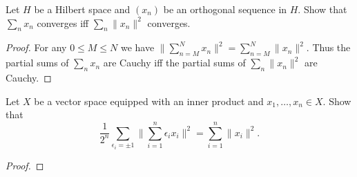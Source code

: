 \documentclass{article}
\begin{document}
 Let $H$ be a Hilbert space and $(x_n)$ be an orthogonal sequence in $H$. Show that $\sum_n x_n$ converges iff $\sum_n \|x_n\|^2$ converges. 
\begin{proof}
For any $0 \le M \le N$ we have $\|\sum_{n=M}^N x_n \|^2 = \sum_{n=M}^N \|x_n\|^2$.  Thus the partial sums of $\sum_n x_n$ are Cauchy iff the partial sums of $\sum_n \|x_n\|^2$ are Cauchy.
\end{proof}


 Let $X$ be a vector space equipped with an inner product and $x_1, \ldots, x_n \in X$. Show that
$$ \frac 1 {2^n} \sum_{\epsilon_i = \pm 1} \| \sum_{i=1}^n \epsilon_i x_i \|^2 = \sum_{i=1}^n \|x_i\|^2.$$
\begin{proof}

\end{proof}
\end{document}
